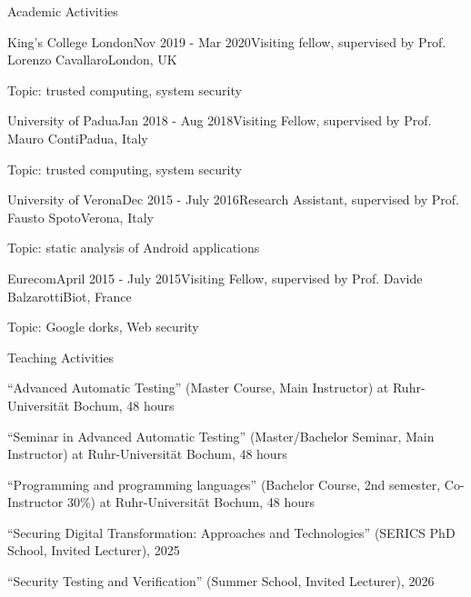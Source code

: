 \documentclass{resume} %
\begin{document}

\begin{rSection}{Academic Activities}

\begin{rSubsection}{King's College London}{Nov 2019 - Mar 2020}{Visiting 
fellow, supervised by Prof. Lorenzo Cavallaro}{London, UK}
	\item Topic: trusted computing, system security
\end{rSubsection}

\begin{rSubsection}{University of Padua}{Jan 2018 - Aug 2018}{Visiting Fellow, supervised by Prof. Mauro Conti}{Padua, Italy}
    \item Topic: trusted computing, system security
\end{rSubsection}


\begin{rSubsection}{University of Verona}{Dec 2015 - July 2016}{Research Assistant, supervised by Prof. Fausto Spoto}{Verona, Italy}
\item Topic: static analysis of Android applications
\end{rSubsection}

\begin{rSubsection}{Eurecom}{April 2015 - July 2015}{Visiting Fellow, supervised by Prof. Davide Balzarotti}{Biot, France}
\item Topic: Google dorks, Web security
\end{rSubsection}

\newpage
\begin{rSection}{Teaching Activities}
\item ``Advanced Automatic Testing'' (Master Course, Main Instructor) at Ruhr-Universität Bochum, 48 hours
\item ``Seminar in Advanced Automatic Testing'' (Master/Bachelor Seminar, Main Instructor) at Ruhr-Universität Bochum, 48 hours
\item ``Programming and programming languages'' (Bachelor Course, 2nd semester, Co-Instructor 30\%) at Ruhr-Universität Bochum, 48 hours
\item ``Securing Digital Transformation: Approaches and Technologies'' (SERICS PhD School, Invited Lecturer), 2025
\item ``Security Testing and Verification'' (Summer School, Invited Lecturer), 2026
\end{rSection}


\end{rSection}
\end{document}
